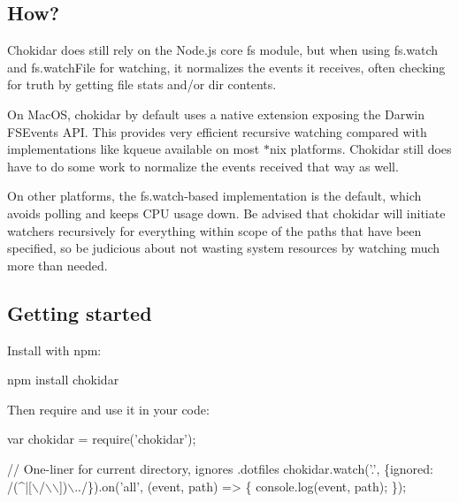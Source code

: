 \subsection*{How?}

Chokidar does still rely on the Node.\+js core {\ttfamily fs} module, but when using {\ttfamily fs.\+watch} and {\ttfamily fs.\+watch\+File} for watching, it normalizes the events it receives, often checking for truth by getting file stats and/or dir contents.

On Mac\+OS, chokidar by default uses a native extension exposing the Darwin {\ttfamily F\+S\+Events} A\+PI. This provides very efficient recursive watching compared with implementations like {\ttfamily kqueue} available on most $\ast$nix platforms. Chokidar still does have to do some work to normalize the events received that way as well.

On other platforms, the {\ttfamily fs.\+watch}-\/based implementation is the default, which avoids polling and keeps C\+PU usage down. Be advised that chokidar will initiate watchers recursively for everything within scope of the paths that have been specified, so be judicious about not wasting system resources by watching much more than needed.

\subsection*{Getting started}

Install with npm\+:


\begin{DoxyCode}
npm install chokidar
\end{DoxyCode}


Then {\ttfamily require} and use it in your code\+:


\begin{DoxyCode}
var chokidar = require('chokidar');

// One-liner for current directory, ignores .dotfiles
chokidar.watch('.', \{ignored: /(^|[\(\backslash\)/\(\backslash\)\(\backslash\)])\(\backslash\)../\}).on('all', (event, path) => \{
  console.log(event, path);
\});
\end{DoxyCode}



